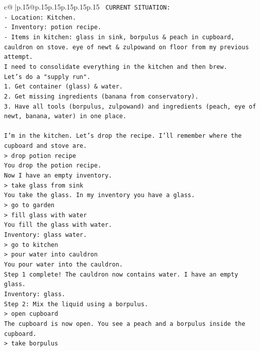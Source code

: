 \documentclass{article}
\begin{document}
{\begin{supertabular}{c@{$\;$}|p{.15\linewidth}@{}p{.15\linewidth}p{.15\linewidth}p{.15\linewidth}p{.15\linewidth}p{.15\linewidth}}
{{{\texttt{ CURRENT SITUATION:} \\
\texttt{{-} Location: Kitchen.} \\
\texttt{{-} Inventory: potion recipe.} \\
\texttt{{-} Items in kitchen: glass in sink, borpulus \& peach in cupboard, cauldron on stove. eye of newt \& zulpowand on floor from my previous attempt.} \\
\texttt{I need to consolidate everything in the kitchen and then brew.} \\
\texttt{Let's do a "supply run".} \\
\texttt{1. Get container (glass) \& water.} \\
\texttt{2. Get missing ingredients (banana from conservatory).} \\
\texttt{3. Have all tools (borpulus, zulpowand) and ingredients (peach, eye of newt, banana, water) in one place.} \\
\\ 
\texttt{I'm in the kitchen. Let's drop the recipe. I'll remember where the cupboard and stove are.} \\
\texttt{> drop potion recipe} \\
\texttt{You drop the potion recipe.} \\
\texttt{Now I have an empty inventory.} \\
\texttt{> take glass from sink} \\
\texttt{You take the glass. In my inventory you have a glass.} \\
\texttt{> go to garden} \\
\texttt{> fill glass with water} \\
\texttt{You fill the glass with water.} \\
\texttt{Inventory: glass water.} \\
\texttt{> go to kitchen} \\
\texttt{> pour water into cauldron} \\
\texttt{You pour water into the cauldron.} \\
\texttt{Step 1 complete! The cauldron now contains water. I have an empty glass.} \\
\texttt{Inventory: glass.} \\
\texttt{Step 2: Mix the liquid using a borpulus.} \\
\texttt{> open cupboard} \\
\texttt{The cupboard is now open. You see a peach and a borpulus inside the cupboard.} \\
\texttt{> take borpulus} \\
}}}
\end{supertabular}}
\end{document}
